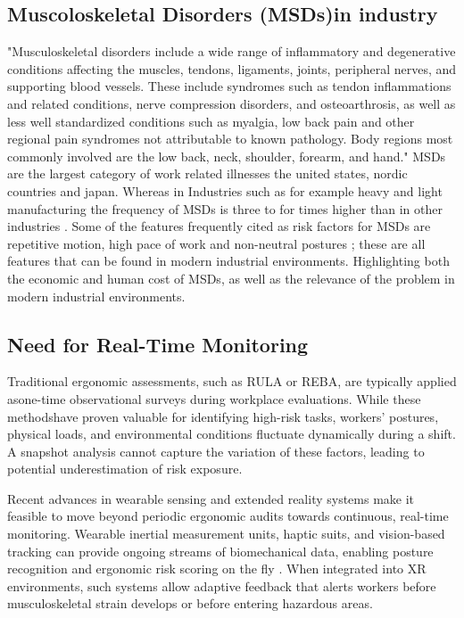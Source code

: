\subsection{Muscoloskeletal Disorders (MSDs)in industry}
"Musculoskeletal disorders include a wide range of inflammatory and degenerative conditions affecting the muscles, tendons, ligaments, joints, peripheral nerves, and supporting blood vessels. These include syndromes such as tendon inflammations and related conditions, nerve compression disorders, and osteoarthrosis, as well as less well standardized conditions such as myalgia, low back pain and other regional pain syndromes not attributable to known pathology. Body regions most commonly involved are the low back, neck, shoulder, forearm, and hand." \cite{punnett2004wrmsd}
MSDs are the largest category of work related illnesses the united states, nordic countries and japan. Whereas in Industries such as for example heavy and light manufacturing the frequency of MSDs is three to for times higher than in other industries \cite{punnett2004wrmsd}. 
Some of the features frequently cited as risk factors for MSDs are repetitive motion, high pace of work and non-neutral postures \cite{punnett2004wrmsd}; these are all features that can be found in modern industrial environments. Highlighting both the economic and human cost of MSDs, as well as the relevance of the problem in modern industrial environments.

\subsection{Need for Real-Time Monitoring}
Traditional ergonomic assessments, such as RULA or REBA, are typically applied asone-time observational surveys during workplace evaluations. While these methodshave proven valuable for identifying high-risk tasks, workers’ postures, physical loads, and environmental conditions fluctuate dynamically during a shift. A snapshot analysis cannot capture the variation of these factors, leading to potential underestimation of risk exposure.

Recent advances in wearable sensing and extended reality systems make it feasible to move beyond periodic ergonomic audits towards continuous, real-time monitoring. Wearable inertial measurement units, haptic suits, and vision-based tracking can provide ongoing streams of biomechanical data, enabling posture recognition and ergonomic risk scoring on the fly \cite{syberfeldt2016vrar,portman2022xrsurvey}. When integrated into XR environments, such systems allow adaptive feedback that alerts workers before musculoskeletal strain develops or before entering hazardous areas.


